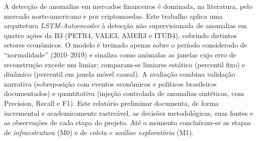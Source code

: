 A detecção de anomalias em mercados financeiros é dominada, na literatura, pelo
mercado norte-americano e por criptomoedas. Este trabalho aplica uma arquitetura
\emph{LSTM-Autoencoder} à detecção não supervisionada de anomalias em quatro ações
da B3 (PETR4, VALE3, AMER3 e ITUB4), cobrindo distintos setores econômicos. O modelo
é treinado apenas sobre o período considerado de ``normalidade'' (2010--2019) e sinaliza
como anômalas as janelas cujo erro de reconstrução excede um limiar; comparam-se
limiares estático (percentil fixo) e dinâmico (percentil em janela móvel causal).
A avaliação combina validação narrativa (sobreposição com eventos econômicos e políticos
brasileiros documentados) e quantitativa (injeção controlada de anomalias sintéticas,
com Precision, Recall e F1). Este relatório preliminar documenta, de forma incremental e
academicamente rastreável, as decisões metodológicas, suas fontes e as observações de
cada etapa do projeto. Até o momento concluíram-se as etapas de \emph{infraestrutura}
(M0) e de \emph{coleta e análise exploratória} (M1).
